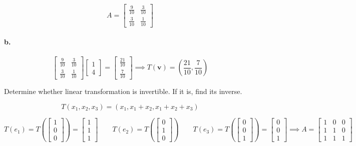 \documentclass{report}
\begin{document}
$$
A = \begin{bmatrix} \frac{9}{10} & \frac{3}{10} \\ \frac{3}{10} & \frac{1}{10} \end{bmatrix}
$$

\paragraph{b.}

$$
\begin{bmatrix} \frac{9}{10} & \frac{3}{10} \\ \frac{3}{10} & \frac{1}{10} \end{bmatrix} \begin{bmatrix} 1 \\ 4 \end{bmatrix} = \begin{bmatrix} \frac{21}{10} \\ \frac{7}{10} \end{bmatrix} \implies T(\bm{v}) = \left(\frac{21}{10}, \frac{7}{10} \right)
$$

\begin{tcolorbox}[colframe = lightred]
	Determine whether linear transformation is invertible. If it is, find its inverse. 
	
	$$
	T(x_1, x_2, x_3) = (x_1, x_1 + x_2, x_1 + x_2 + x_3) 
	$$
\end{tcolorbox}

$$
T(e_1) = T \left( \begin{bmatrix} 1 \\ 0 \\ 0 \end{bmatrix}\right) = \begin{bmatrix} 1 \\ 1 \\ 1 \end{bmatrix} \quad \quad T(e_2) = T \left( \begin{bmatrix} 0 \\ 1 \\ 0 \end{bmatrix} \right)  \quad \quad T(e_3) = T\left( \begin{bmatrix} 0 \\ 0 \\ 1 \end{bmatrix} \right) = \begin{bmatrix} 0 \\ 0 \\ 1 \end{bmatrix} \implies A = \begin{bmatrix} 1 & 0 & 0 \\ 1 & 1 & 0 \\ 1 & 1 & 1 \end{bmatrix} 
$$
\end{document}
